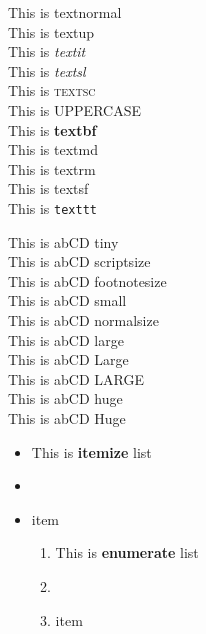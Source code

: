 \documentclass[12pt, a4paper]{report}
\begin{document}
\newpage
{}
\selectfont

This is \textnormal{textnormal}\\ This is \textup{textup}\\
This is \textit{textit}\\ This is \textsl{textsl}\\
This is \textsc{textsc}\\ This is \uppercase{uppercase}\\
This is \textbf{textbf}\\ This is \textmd{textmd}\\
This is \textrm{textrm}\\
This is \textsf{textsf}\\ This is \texttt{texttt}\\


\vfill

{This is \tiny abCD tiny}\\
{This is \scriptsize abCD scriptsize}\\
{This is \footnotesize abCD footnotesize}\\
{This is \small abCD small}\\
{This is \normalsize abCD normalsize}\\
{This is \large abCD large}\\
{This is \Large abCD Large}\\
{This is \LARGE abCD LARGE}\\
{This is \huge abCD huge}\\
{This is \Huge abCD Huge}\\


\newpage

\begin{itemize}
    \item This is \textbf{itemize} list
    \item \lipsum[1]
    \item item


    \begin{enumerate}
        \item This is \textbf{enumerate} list
        \item \lipsum[2]
        \item item
    \end{enumerate}

\end{itemize}
\end{document}

